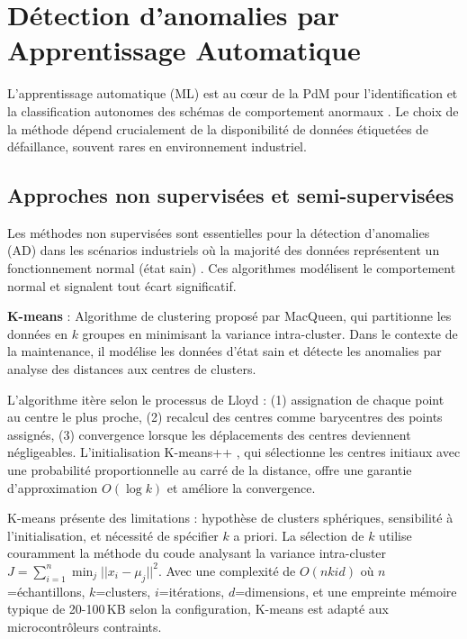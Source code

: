 \section{Détection d'anomalies par Apprentissage Automatique}
\label{sec:detection_anomalies}

L'apprentissage automatique (ML) est au cœur de la PdM pour l'identification et la classification autonomes des schémas de comportement anormaux \cite{achouch2022,chandola2009}. Le choix de la méthode dépend crucialement de la disponibilité de données étiquetées de défaillance, souvent rares en environnement industriel.

\subsection{Approches non supervisées et semi-supervisées}

Les méthodes non supervisées sont essentielles pour la détection d'anomalies (AD) dans les scénarios industriels où la majorité des données représentent un fonctionnement normal (état sain) \cite{arciniegas2025}. Ces algorithmes modélisent le comportement normal et signalent tout écart significatif.

\textbf{K-means} \cite{macqueen1967} : Algorithme de clustering proposé par MacQueen, qui partitionne les données en $k$ groupes en minimisant la variance intra-cluster. Dans le contexte de la maintenance, il modélise les données d'état sain et détecte les anomalies par analyse des distances aux centres de clusters.

L'algorithme itère selon le processus de Lloyd : (1) assignation de chaque point au centre le plus proche, (2) recalcul des centres comme barycentres des points assignés, (3) convergence lorsque les déplacements des centres deviennent négligeables. L'initialisation K-means++ \cite{arthur2007}, qui sélectionne les centres initiaux avec une probabilité proportionnelle au carré de la distance, offre une garantie d'approximation $O(\log k)$ et améliore la convergence.

K-means présente des limitations : hypothèse de clusters sphériques, sensibilité à l'initialisation, et nécessité de spécifier $k$ a priori. La sélection de $k$ utilise couramment la méthode du coude analysant la variance intra-cluster $J = \sum_{i=1}^{n} \min_{j} ||x_i - \mu_j||^2$. Avec une complexité de $O(nkid)$ où $n$=échantillons, $k$=clusters, $i$=itérations, $d$=dimensions, et une empreinte mémoire typique de 20-100\,KB selon la configuration, K-means est adapté aux microcontrôleurs contraints.

